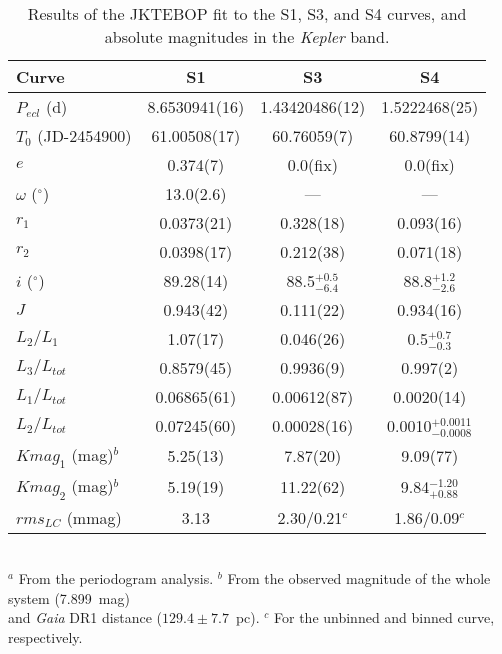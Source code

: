 \documentclass{aa}
\newcommand{\kep}{{\it Kepler }}
\begin{document}
\begin{table*}
\centering
\caption{Results of the JKTEBOP fit to the S1, S3, and S4 curves, and absolute
magnitudes in the \kep band.}\label{tab_0415_kk}
\begin{tabular}{lccc}
\hline \hline
Curve & S1 & S3 & S4 \\
\hline
$P_{ecl}$ (d) 		& 8.6530941(16)	& 1.43420486(12)& 1.5222468(25) \\
$T_0$ (JD-2454900)	& 61.00508(17)	& 60.76059(7) 	& 60.8799(14) \\
$e$ 			& 0.374(7) 	& 0.0(fix) 	& 0.0(fix) \\
$\omega$ ($^\circ$)	& 13.0(2.6) 	& --- 		& --- \\
$r_1$ 			& 0.0373(21) 	& 0.328(18) 	& 0.093(16) \\
$r_2$			& 0.0398(17) 	& 0.212(38) 	& 0.071(18) \\
$i$ ($^\circ$) 	& 89.28(14) 	& 88.5$^{+0.5}_{-6.4}$ & 88.8$^{+1.2}_{-2.6}$\\
$J$ 			& 0.943(42) 	& 0.111(22)	& 0.934(16) \\
$L_2/L_1$ 		& 1.07(17) 	& 0.046(26) 	& 0.5$^{+0.7}_{-0.3}$\\
$L_3/L_{tot}$ 		& 0.8579(45) 	& 0.9936(9) 	& 0.997(2)\\
$L_1/L_{tot}$ 		& 0.06865(61)	& 0.00612(87)	& 0.0020(14)	\\
$L_2/L_{tot}$ 		& 0.07245(60)	& 0.00028(16)	& 0.0010$_{-0.0008}^{+0.0011}$	\\
$Kmag_1$ (mag)$^b$	&  5.25(13)	&  7.87(20)	&  9.09(77)\\
$Kmag_2$ (mag)$^b$	&  5.19(19)	& 11.22(62)	&  9.84$^{-1.20}_{+0.88}$ \\
$rms_{LC}$ (mmag) 	& 3.13 		& 2.30/0.21$^c$	& 1.86/0.09$^c$ \\
\hline
\end{tabular}
\\$^a$ From the periodogram analysis. 
$^b$ From the observed magnitude of the whole system (7.899~mag)
\\ and {\it Gaia} DR1 distance ($129.4\pm7.7$~pc).
$^c$ For the unbinned and binned curve, respectively.
\end{table*}
\end{document}
